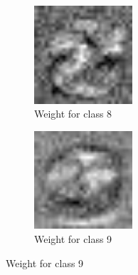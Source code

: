 \begin{figure}
    \begin{subfigure}
        \centering
        \includegraphics[width=0.4\textwidth]{figures/weights/class_8_weight_image.jpg}
        \caption{Weight for class 8}
        \label{fig:class_8_weight}
    \end{subfigure}
    \begin{subfigure}
        \centering
        \includegraphics[width=0.4\textwidth]{figures/weights/class_9_weight_image.jpg}
        \caption{Weight for class 9}
        \label{fig:class_9_weight}
    \end{subfigure}

\end{figure}

